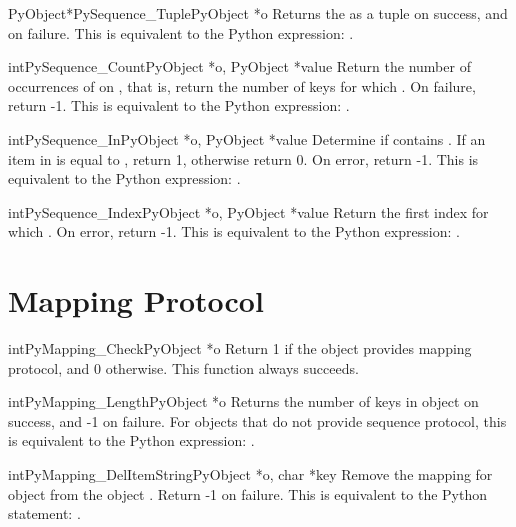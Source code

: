 \documentclass[twoside,openright]{report}
\begin{document}
\begin{cfuncdesc}{PyObject*}{PySequence_Tuple}{PyObject *o}
Returns the  as a tuple on success, and \NULL{} on failure.
This is equivalent to the Python expression: .
\end{cfuncdesc}

\begin{cfuncdesc}{int}{PySequence_Count}{PyObject *o, PyObject *value}
Return the number of occurrences of  on , that is,
return the number of keys for which .  On
failure, return -1.  This is equivalent to the Python
expression: .
\end{cfuncdesc}

\begin{cfuncdesc}{int}{PySequence_In}{PyObject *o, PyObject *value}
Determine if  contains .  If an item in  is equal to
, return 1, otherwise return 0.  On error, return -1.  This
is equivalent to the Python expression: .
\end{cfuncdesc}

\begin{cfuncdesc}{int}{PySequence_Index}{PyObject *o, PyObject *value}
Return the first index for which .  On error,
return -1.    This is equivalent to the Python
expression: .
\end{cfuncdesc}

\section{Mapping Protocol}

\begin{cfuncdesc}{int}{PyMapping_Check}{PyObject *o}
Return 1 if the object provides mapping protocol, and 0
otherwise.  
This function always succeeds.
\end{cfuncdesc}


\begin{cfuncdesc}{int}{PyMapping_Length}{PyObject *o}
Returns the number of keys in object  on success, and -1 on
failure.  For objects that do not provide sequence protocol,
this is equivalent to the Python expression: .
\end{cfuncdesc}


\begin{cfuncdesc}{int}{PyMapping_DelItemString}{PyObject *o, char *key}
Remove the mapping for object  from the object .
Return -1 on failure.  This is equivalent to
the Python statement: .
\end{cfuncdesc}
\end{document}
